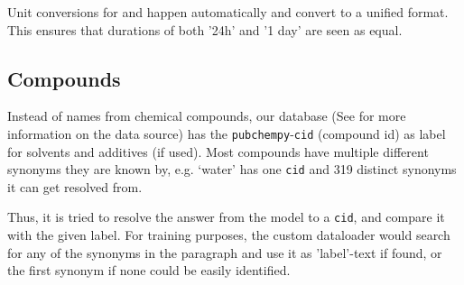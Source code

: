 Unit conversions for \ttemp and \ttime happen automatically and convert to a unified format. This ensures that durations of both '24h' and '1 day' are seen as equal.

\subsection{Compounds}\label{sub:compsolv}
Instead of names from chemical compounds, our database (See  for more information on the data source) has the \texttt{pubchempy}-\texttt{cid} (compound id) as label for solvents and additives (if used).
Most compounds have multiple different synonyms they are known by, e.g. `water' has one \texttt{cid} and 319 distinct synonyms it can get resolved from.

Thus, it is tried to resolve the answer from the model to a \texttt{cid}, and compare it with the given label.
For training purposes, the custom dataloader would search for any of the synonyms in the paragraph and use it as 'label'-text if found, or the first synonym if none could be easily identified.


